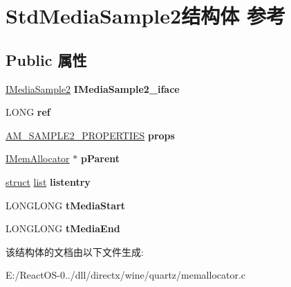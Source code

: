 \hypertarget{struct_std_media_sample2}{}\section{Std\+Media\+Sample2结构体 参考}
\label{struct_std_media_sample2}
\subsection*{Public 属性}
\begin{DoxyCompactItemize}
\item 
\mbox{\label{struct_std_media_sample2_acfcab93950eafdc6d8608851d0d02993}} 
\hyperlink{interface_i_media_sample2}{I\+Media\+Sample2} {\bfseries I\+Media\+Sample2\+\_\+iface}
\item 
\mbox{\label{struct_std_media_sample2_aca0e5140e60b4f88da49a7d81357eff9}} 
L\+O\+NG {\bfseries ref}
\item 
\mbox{\label{struct_std_media_sample2_a1611279ad67238b67be848db7eb5685a}} 
\hyperlink{structtag_a_m___s_a_m_p_l_e2___p_r_o_p_e_r_t_i_e_s}{A\+M\+\_\+\+S\+A\+M\+P\+L\+E2\+\_\+\+P\+R\+O\+P\+E\+R\+T\+I\+ES} {\bfseries props}
\item 
\mbox{\label{struct_std_media_sample2_a7fbc9dfd62487b6a3a3a67b351dad7e0}} 
\hyperlink{interface_i_mem_allocator}{I\+Mem\+Allocator} $\ast$ {\bfseries p\+Parent}
\item 
\mbox{\label{struct_std_media_sample2_a95ef132fffbcaf724aa9b8241fbce89e}} 
\hyperlink{interfacestruct}{struct} \hyperlink{classlist}{list} {\bfseries listentry}
\item 
\mbox{\label{struct_std_media_sample2_a47f1a97759cbeea0fa145f786db3d496}} 
L\+O\+N\+G\+L\+O\+NG {\bfseries t\+Media\+Start}
\item 
\mbox{\label{struct_std_media_sample2_adb0c41c920acdce2ecba8961386ecdb6}} 
L\+O\+N\+G\+L\+O\+NG {\bfseries t\+Media\+End}
\end{DoxyCompactItemize}


该结构体的文档由以下文件生成\+:\begin{DoxyCompactItemize}
\item 
E\+:/\+React\+O\+S-\/0../dll/directx/wine/quartz/memallocator.\+c\end{DoxyCompactItemize}
